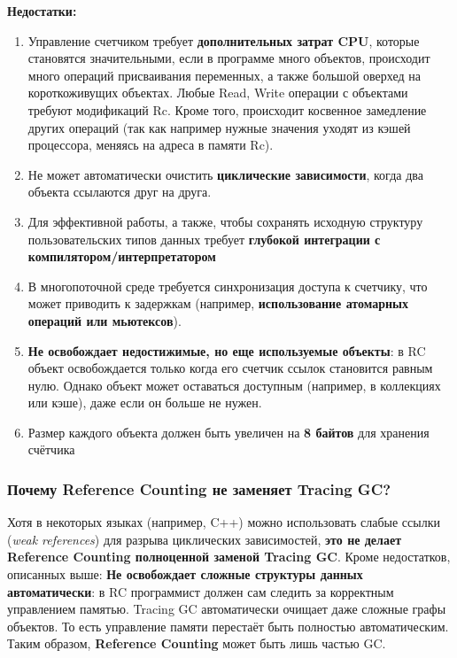 \textbf{Недостатки:}
\begin{enumerate}[label=\arabic*.]
    \item Управление счетчиком требует \textbf{дополнительных затрат CPU}, которые становятся значительными, если в программе много объектов, происходит много операций присваивания переменных, а также большой оверхед на короткоживущих объектах. Любые Read, Write операции с объектами требуют модификаций Rc. Кроме того, происходит косвенное замедление других операций (так как например нужные значения уходят из кэшей процессора, меняясь на адреса в памяти Rc).
    \item Не может автоматически очистить \textbf{циклические зависимости}, когда два объекта ссылаются друг на друга.
    \item Для эффективной работы, а также, чтобы сохранять исходную структуру пользовательских типов данных требует \textbf{глубокой интеграции с компилятором/интерпретатором}
    \item В многопоточной среде требуется синхронизация доступа к счетчику, что может приводить к задержкам (например, \textbf{использование атомарных операций или мьютексов}).
    \item \textbf{Не освобождает недостижимые, но еще используемые объекты}: в RC объект освобождается только когда его счетчик ссылок становится равным нулю. Однако объект может оставаться доступным (например, в коллекциях или кэше), даже если он больше не нужен.
    \item Размер каждого объекта должен быть увеличен на \textbf{8 байтов} для хранения счётчика
\end{enumerate}

\subsubsection{Почему Reference Counting не заменяет Tracing GC?}

Хотя в некоторых языках (например, C++) можно использовать слабые ссылки (\textit{weak references}) для разрыва циклических зависимостей, \textbf{это не делает Reference Counting полноценной заменой Tracing GC}. Кроме недостатков, описанных выше:
\textbf{Не освобождает сложные структуры данных автоматически}: в RC программист должен сам следить за корректным управлением памятью. Tracing GC автоматически очищает даже сложные графы объектов. То есть управление памяти перестаёт быть полностью автоматическим.
Таким образом, \textbf{Reference Counting} может быть лишь частью GC.



